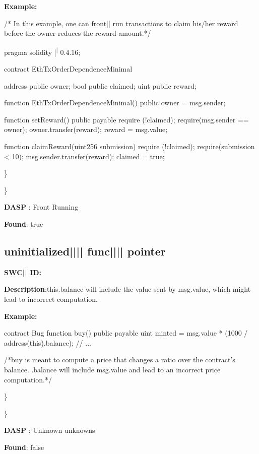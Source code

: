 \documentclass{article}
\begin{document}
\textbf{Example:} 
\begin{ffcode} 

/* In this example, one can front|\textendash| run transactions to claim his/her reward before the owner reduces the reward amount.*/ 

pragma solidity |\textsuperscript| 0.4.16;

contract EthTxOrderDependenceMinimal {
    address public owner;
    bool public claimed;
    uint public reward;

    function EthTxOrderDependenceMinimal() public {
        owner = msg.sender;
    }

    function setReward() public payable {
        require (!claimed);
        require(msg.sender == owner);
        owner.transfer(reward);
        reward = msg.value;
    }

    function claimReward(uint256 submission) {
        require (!claimed);
        require(submission < 10);
        msg.sender.transfer(reward);
        claimed = true;
    }
}

\end{ffcode} 
\} 

\} 

\textbf{DASP} : Front Running

\textbf{Found}: true

\subsection{uninitialized{||\textunderscore|| }func{||\textunderscore|| }pointer} 
\textbf{SWC{|\textunderscore| }ID:} 

\textbf{Description}:this.balance will include the value sent by msg.value, which might lead to incorrect computation.


\textbf{Example:} 
\begin{ffcode} 

contract Bug{
  function buy() public payable{
    uint minted = msg.value * (1000 / address(this).balance);
    // ...
  }
}

 /*buy is meant to compute a price that changes a ratio over the contract's balance. .balance will include msg.value and lead to an incorrect price computation.*/ 

\end{ffcode} 
\} 

\} 

\textbf{DASP} : Unknown unknowns

\textbf{Found}: false
\end{document}
